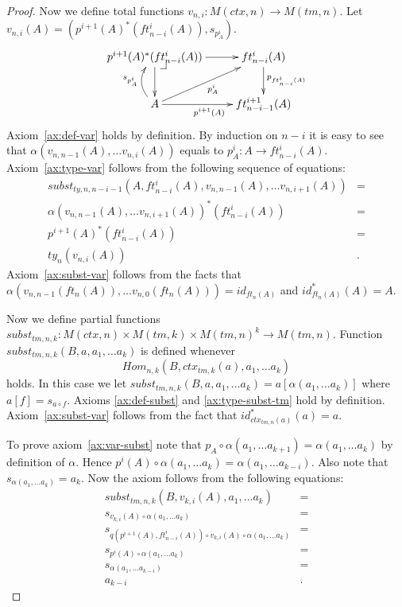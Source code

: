 \documentclass[reqno]{amsart}
\makeatletter
\theoremstyle{definition}
\theoremstyle{remark}
\numberwithin{figure}{section}
\newcommand{\pb}[1][dr]{\save*!/#1-1.2pc/#1:(-1,1)@^{|-}\restore}
\makeatother
\begin{document}
\begin{proof}
Now we define total functions $v_{n,i} : M(ctx,n) \to M(tm,n)$.
Let $v_{n,i}(A) = (p^{i+1}(A)^*(ft^i_{n-i}(A)), s_{p^i_A})$.
\[ \xymatrix{ p^{i+1}(A)^*(ft^i_{n-i}(A)) \ar[r] \ar[d] \pb & ft^i_{n-i}(A) \ar[d]^{p_{ft^i_{n-i}(A)}} \\
              A \ar[r]_{p^{i+1}(A)} \ar@/^1pc/[u]^{s_{p^i_A}} \ar[ur]_{p^i_A} & ft^{i+1}_{n-i-1}(A)
            } \]
Axiom~\eqref{ax:def-var} holds by definition.
By induction on $n-i$ it is easy to see that $\alpha(v_{n,n-1}(A), \ldots v_{n,i}(A))$ equals to $p_A^i : A \to ft^i_{n-i}(A)$.
Axiom~\eqref{ax:type-var} follows from the following sequence of equations:
\begin{align*}
subst_{ty,n,n-i-1}(A, ft^i_{n-i}(A), v_{n,n-1}(A), \ldots v_{n,i+1}(A)) & = \\
\alpha(v_{n,n-1}(A), \ldots v_{n,i+1}(A))^*(ft^i_{n-i}(A)) & = \\
p^{i+1}(A)^*(ft^i_{n-i}(A)) & = \\
ty_n(v_{n,i}(A)) & .
\end{align*}
Axiom~\eqref{ax:subst-var} follows from the facts that $\alpha(v_{n,n-1}(ft_n(A)), \ldots v_{n,0}(ft_n(A))) = id_{ft_n(A)}$ and $id_{ft_n(A)}^*(A) = A$.

Now we define partial functions $subst_{tm,n,k} : M(ctx,n) \times M(tm,k) \times M(tm,n)^k \to M(tm,n)$.
Function $subst_{tm,n,k}(B, a, a_1, \ldots a_k)$ is defined whenever \[ Hom_{n,k}(B, ctx_{tm,k}(a), a_1, \ldots a_k) \] holds.
In this case we let $subst_{tm,n,k}(B, a, a_1, \ldots a_k) = a[\alpha(a_1, \ldots a_k)]$ where $a[f] = s_{a \circ f}$.
Axioms \eqref{ax:def-subst} and \eqref{ax:type-subst-tm} hold by definition.
Axiom~\eqref{ax:subst-var} follows from the fact that $id_{ctx_{tm,n}(a)}^*(a) = a$.

To prove axiom~\eqref{ax:var-subst} note that $p_A \circ \alpha(a_1, \ldots a_{k+1}) = \alpha(a_1, \ldots a_k)$ by definition of $\alpha$.
Hence $p^i(A) \circ \alpha(a_1, \ldots a_k) = \alpha(a_1, \ldots a_{k-i})$.
Also note that $s_{\alpha(a_1, \ldots a_k)} = a_k$.
Now the axiom follows from the following equations:
\begin{align*}
subst_{tm,n,k}(B, v_{k,i}(A), a_1, \ldots a_k) & = \\
s_{v_{k,i}(A) \circ \alpha(a_1, \ldots a_k)} & = \\
s_{q(p^{i+1}(A), ft^i_{n-i}(A)) \circ v_{k,i}(A) \circ \alpha(a_1, \ldots a_k)} & = \\
s_{p^i(A) \circ \alpha(a_1, \ldots a_k)} & = \\
s_{\alpha(a_1, \ldots a_{k-i})} & = \\
a_{k-i} & .
\end{align*}


\end{proof}
\end{document}
